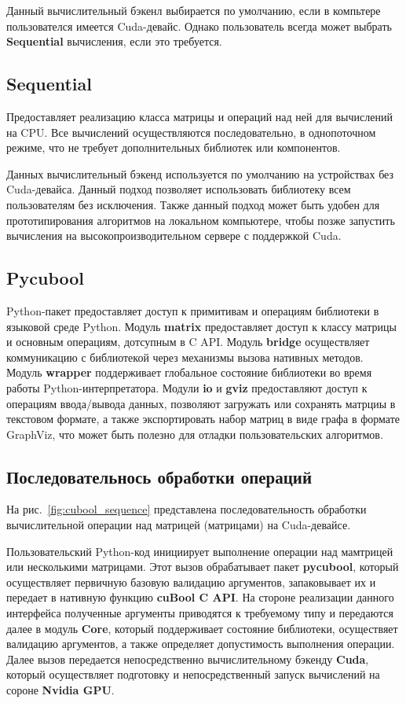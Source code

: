Данный вычислительный бэкенл выбирается по умолчанию, если в компьтере пользователся имеется Cuda-девайс.
Однако пользователь всегда может выбрать \textbf{Sequential} вычисления, если это требуется. 

\subsection*{Sequential}

Предоставляет реализацию класса матрицы и операций над ней для вычислений на CPU. Все вычислений осуществляются последовательно, в однопоточном режиме, что не требует дополнительных библиотек или компонентов.

Данных вычислительный бэкенд используется по умолчанию на устройствах без Cuda-девайса. 
Данный подход позволяет использовать библиотеку всем пользователям без исключения. 
Также данный подход может быть удобен для прототипирования алгоритмов на локальном компьютере, 
чтобы позже запустить вычисления на высокопроизводительном сервере с поддержкой Cuda.

\subsection*{Pycubool}

Python-пакет предоставляет доступ к примитивам и операциям библиотеки в языковой среде Python.
Модуль \textbf{matrix} предоставляет доступ к классу матрицы и основным операциям, дотсупным в C API.
Модуль \textbf{bridge} осуществляет коммуникацию с библиотекой через механизмы вызова нативных методов. 
Модуль \textbf{wrapper} поддерживает глобальное состояние библиотеки во время работы Python-интерпретатора. 
Модули \textbf{io} и \textbf{gviz} предоставляют доступ к операциям ввода/вывода данных, 
позволяют загружать или сохранять матрциы в текстовом формате, 
а также экспортировать набор матриц в виде графа в формате GraphViz, 
что может быть полезно для отладки пользовательских алгоритмов.

\subsection{Последовательнось обработки операций}

На рис.~\ref{fig:cubool_sequence} представлена последовательность обработки вычислительной операции над матрицей (матрицами) на Cuda-девайсе. 

Пользовательский Python-код инициирует выполнение операции над мамтрицей или несколькими матрицами.
Этот вызов обрабатывает пакет \textbf{pycubool}, который осуществляет первичную базовую валидацию аргументов, запаковывает их и передает в нативную функцию \textbf{cuBool C API}.
На стороне реализации данного интерфейса полученные аргументы приводятся к требуемому типу и передаются далее в модуль \textbf{Core}, 
который поддерживает состояние библиотеки, 
осуществяет валидацию аргументов, а также определяет допустимость выполнения операции. 
Далее вызов передается непосредственно вычислительному бэкенду \textbf{Cuda}, 
который осуществляет подготовку и непосредственный запуск вычислений на сороне \textbf{Nvidia GPU}. 


